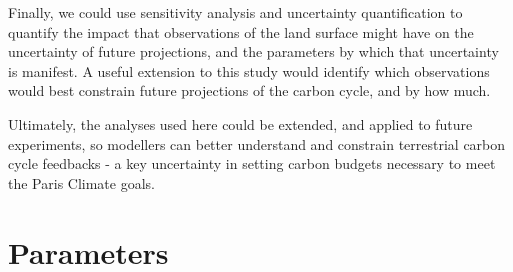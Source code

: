 \documentclass[gmd, manuscript]{copernicus}
\begin{document}
Finally, we could use sensitivity analysis and uncertainty quantification to quantify the impact that observations of the land surface might have on the uncertainty of future projections, and the parameters by which that uncertainty is manifest.
A useful extension to this study would identify which observations would best constrain future projections of the carbon cycle, and by how much.

Ultimately, the analyses used here could be extended, and applied to future experiments, so modellers  can better understand and constrain terrestrial carbon cycle feedbacks - a key uncertainty in setting carbon budgets necessary to meet the Paris Climate goals.
    


\appendix

\section{Parameters}\label{sec:app_parameters}
\end{document}
